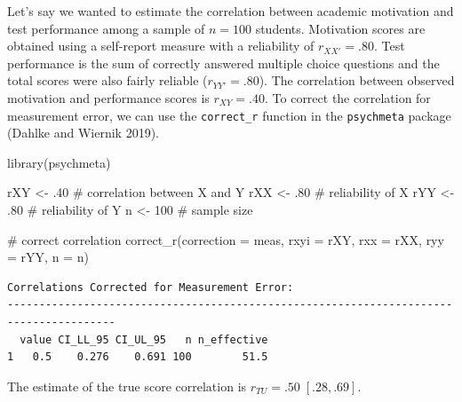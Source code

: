 \documentclass[
  letterpaper,
  DIV=11,
  numbers=noendperiod]{scrreprt}
\newenvironment{Shaded}{}{}
\newcommand{\AttributeTok}[1]{\textcolor[rgb]{0.00,0.34,0.68}{#1}}
\newcommand{\CommentTok}[1]{\textcolor[rgb]{0.54,0.53,0.53}{#1}}
\newcommand{\DecValTok}[1]{\textcolor[rgb]{0.69,0.50,0.00}{#1}}
\newcommand{\FunctionTok}[1]{\textcolor[rgb]{0.39,0.29,0.61}{#1}}
\newcommand{\NormalTok}[1]{\textcolor[rgb]{0.12,0.11,0.11}{#1}}
\newcommand{\OtherTok}[1]{\textcolor[rgb]{0.00,0.43,0.16}{#1}}
\newcommand{\StringTok}[1]{\textcolor[rgb]{0.75,0.01,0.01}{#1}}
\begin{document}
\begin{tcolorbox}[enhanced jigsaw, toptitle=1mm, titlerule=0mm, arc=.35mm, breakable, colframe=quarto-callout-note-color-frame, title={Applied Example in R}, opacitybacktitle=0.6, opacityback=0, colbacktitle=quarto-callout-note-color!10!white, coltitle=black, bottomtitle=1mm, colback=white, bottomrule=.15mm, rightrule=.15mm, toprule=.15mm, leftrule=.75mm, left=2mm]

Let's say we wanted to estimate the correlation between academic
motivation and test performance among a sample of \(n=100\) students.
Motivation scores are obtained using a self-report measure with a
reliability of \(r_{XX'}=.80\). Test performance is the sum of correctly
answered multiple choice questions and the total scores were also fairly
reliable (\(r_{YY'}=.80\)). The correlation between observed motivation
and performance scores is \(r_{XY}=.40\). To correct the correlation for
measurement error, we can use the \texttt{correct\_r} function in the
\texttt{psychmeta} package (Dahlke and Wiernik 2019).

\begin{Shaded}
\begin{Highlighting}[]
\FunctionTok{library}\NormalTok{(psychmeta)}

\NormalTok{rXY }\OtherTok{\textless{}{-}}\NormalTok{ .}\DecValTok{40}  \CommentTok{\# correlation between X and Y}
\NormalTok{rXX }\OtherTok{\textless{}{-}}\NormalTok{ .}\DecValTok{80}  \CommentTok{\# reliability of X}
\NormalTok{rYY }\OtherTok{\textless{}{-}}\NormalTok{ .}\DecValTok{80}  \CommentTok{\# reliability of Y}
\NormalTok{n }\OtherTok{\textless{}{-}} \DecValTok{100}    \CommentTok{\# sample size}

\CommentTok{\# correct correlation}
\FunctionTok{correct\_r}\NormalTok{(}\AttributeTok{correction =} \StringTok{\textquotesingle{}meas\textquotesingle{}}\NormalTok{,}
          \AttributeTok{rxyi =}\NormalTok{ rXY,}
          \AttributeTok{rxx =}\NormalTok{ rXX,}
          \AttributeTok{ryy =}\NormalTok{ rYY,}
          \AttributeTok{n =}\NormalTok{ n)}
\end{Highlighting}
\end{Shaded}

\begin{verbatim}
Correlations Corrected for Measurement Error:
---------------------------------------------------------------------------------------
  value CI_LL_95 CI_UL_95   n n_effective
1   0.5    0.276    0.691 100        51.5
\end{verbatim}

The estimate of the true score correlation is
\(r_{TU} = .50\;[.28, .69]\).

\end{tcolorbox}
\end{document}
